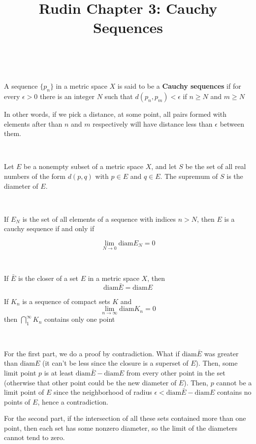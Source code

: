 \documentclass{article}
\title{Rudin Chapter 3: Cauchy Sequences}
\begin{document}
\maketitle

\begin{definition}
\

A sequence $\{p_n\}$ in a metric space $X$ is said to be a \textbf{Cauchy sequences} if for every $\epsilon > 0$ there is an integer $N$ such that $d(p_n, p_m) < \epsilon$ if $n \geq N$ and $m \geq N$

In other words, if we pick a distance, at some point, all pairs formed with elements after than $n$ and $m$ respectively will have distance less than $\epsilon$ between them.
\end{definition}

\begin{definition}[Diameter]
\

Let $E$ be a nonempty subset of a metric space $X$, and let $S$ be the set of all real numbers of the form $d(p,q)$ with $p \in E$ and $q \in E$. The supremum of $S$ is the diameter of $E$.
\end{definition}

\begin{proposition}
\

If $E_N$ is the set of all elements of a sequence with indices $n > N$, then $E$ is a cauchy sequence if and only if 

$$\lim_{N \to 0} \text{diam} E_N = 0$$
\end{proposition}

\begin{theorem}
\

If $\bar{E}$ is the closer of a set $E$ in a metric space $X$, then $$\text{diam} \bar{E} = \text{diam} E$$

If $K_n$ is a sequence of compact sets $K$ and $$\lim_{n\to \infty} \text{diam} K_n = 0$$ then $\bigcap_1^\infty K_n$ contains only one point 
\end{theorem}

\begin{customproof}
\

For the first part, we do a proof by contradiction. What if $\text{diam} \bar{E}$ was greater than $\text{diam} E$ (it can't be less since the closure is a superset of $E$). Then, some limit point $p$ is at least $\text{diam} \bar {E} - \text{diam} E$ from every other point in the set (otherwise that other point could be the new diameter of $E$). Then, $p$ cannot be a limit point of $E$ since the neighborhood of radius $\epsilon < \text{diam} \bar {E} - \text{diam} E$ contains no points of $E$, hence a contradiction.

For the second part, if the intersection of all these sets contained more than one point, then each set has some nonzero diameter, so the limit of the diameters cannot tend to zero.
\end{customproof}
\end{document}
